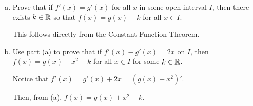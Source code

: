 \begin{prob}
  \begin{enumerate}[(a)]
    \item Prove that if $f'(x) = g'(x)$ for all $x$ in some open interval $I$,
          then there exists $k \in \mathbb{R}$ so that $f(x) = g(x) + k$ for all $x \in I$.
          \begin{prf}
            This follows directly from the Constant Function Theorem.
          \end{prf}
    \item Use part (a) to prove that if $f'(x) - g'(x) = 2x$ on $I$,
          then $f(x) = g(x) + x^2 + k$ for all $x \in I$ for some $k \in \mathbb{R}$.
          \begin{prf}
            Notice that $f'(x) = g'(x) + 2x = (g(x)+x^2)'$.

            Then, from (a), $f(x) = g(x) + x^2 + k$.
          \end{prf}
  \end{enumerate}
\end{prob}

